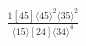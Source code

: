\documentclass[varwidth, border=5pt]{standalone}
\begin{document}
\begin{my}
$\begin{gathered}
\scriptscriptstyle\frac{1[45]⟨45⟩^2⟨35⟩^2}{⟨15⟩[24]⟨34⟩^4}
\end{gathered}$
\end{my}
\end{document}

